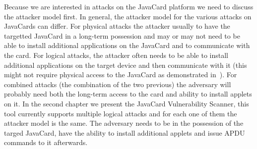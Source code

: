 {        Because we are interested in attacks on the JavaCard platform we need to discuss the attacker model first. In general, the attacker model for the various attacks on JavaCards can differ. For physical attacks the attacker usually to have the targetted JavaCard in a long-term possession and may or may not need to be able to install additional applications on the JavaCard and to communicate with the card. For logical attacks, the attacker often needs to be able to install additional applications on the target device and then communicate with it (this might not require physical access to the JavaCard as demonstrated in~\cite{se:gemalto:part}). For combined attacks (the combination of the two previous) the adversary will probably need both the long-term access to the card and ability to install applets on it.
        In the second chapter we present the JavaCard Vulnerability Scanner, this tool currently supports multiple logical attacks and for each one of them the attacker model is the same. The adversary needs to be in the possession of the targed JavaCard, have the ability to install additional applets and issue APDU commands to it afterwards.


}
